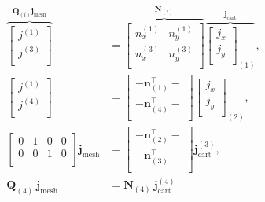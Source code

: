 \begin{equation}
\label{eq:normalProjection}
    \begin{aligned}
    \overbrace{
        \left[\begin{smallmatrix}j^{(1)} \\j^{(3)} \\\end{smallmatrix}\right]
    }^{\mathbf{Q}_{(i)}\mathbf{j}_\text{mesh}}&=
    \overbrace{
        \left[\begin{smallmatrix}n^{(1)}_x & n^{(1)}_y \\n^{(3)}_x & n^{(3)}_y \\\end{smallmatrix}\right]
    }^{\mathbf{N}_{(i)}}
    \overbrace{
        \left[\begin{smallmatrix}j_x \\j_y \\\end{smallmatrix}\right]_{(1)}
    }^{\mathbf{j}_\text{cart}}
    ,\\
    \left[\begin{smallmatrix}j^{(1)} \\j^{(4)} \\\end{smallmatrix}\right]&=\left[
    \begin{smallmatrix}
        - \mathbf{n}_{(1)}^\top - \\
        - \mathbf{n}_{(4)}^\top - \\
    \end{smallmatrix}\right]\left[\begin{smallmatrix}j_x \\j_y \\\end{smallmatrix}\right]_{(2)}
    ,\\
    \left[
        \begin{smallmatrix}
            0 & 1 & 0 & 0 \\
            0 & 0 & 1 & 0 \\
        \end{smallmatrix}
    \right] \mathbf{j}_{\text{mesh}} &=
    \left[\begin{smallmatrix}
        - \mathbf{n}_{(2)}^\top - \\
        - \mathbf{n}_{(3)}^\top - \\
    \end{smallmatrix}\right]
    \mathbf{j}_\text{cart}^{(3)}
    ,\\
    \mathbf{Q}_{(4)} ~ \mathbf{j}_{\text{mesh}}&=
    \mathbf{N}_{(4)} ~
    \mathbf{j}_\text{cart}^{(4)}
    \end{aligned}
\end{equation}
